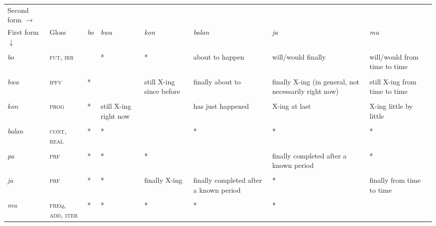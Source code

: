 \documentclass{standalone}
\providecommand{\lsptoprule}{\midrule\toprule}
\begin{document}
		\begin{tabular}{llllllll}
		Second form $\rightarrow$&  & &&&&&\\
		First form $\downarrow$&Gloss&\textit{bo} & \textit{bwa} & \textit{kon} & \textit{balan}  & \textit{ja} & \textit{mu}\\
		\lsptoprule&&&&&&&\\
		\textit{bo} & \textsc{fut}, \textsc{irr} &&*&*&about to happen& will/would finally&will/would from time to time\\
		&&&&&&&\\
		\textit{bwa} & \textsc{ipfv}&*&&still X-ing since before&finally about to&finally X-ing (in general, not necessarily right now)& still X-ing from time to time\\
		&&&&&&&\\
		\textit{kon} &\textsc{prog}&*&still X-ing right now&&has just happened&X-ing at last& X-ing little by little\\
		&&&&&&&\\
		\textit{balan} &\textsc{cont}, \textsc{real} &*&*&&*&*&* \\
		&&&&&&&\\
		\textit{pa} & \textsc{prf}&*&*&*&& finally completed after a known period&* \\
		&&&&&&&\\
		\textit{ja} &\textsc{prf}&*&*&finally X-ing&finally completed after a known period&*&finally from time to time \\
		&&&&&&&\\
		\textit{mu} &\textsc{freq}, \textsc{add}, \textsc{iter}&*&*&*&*&*& \\
	\end{tabular}
	
\end{document}

